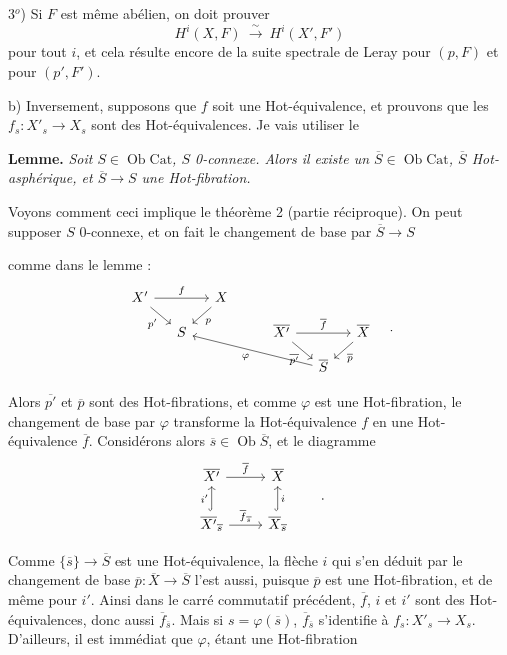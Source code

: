 \documentclass[11pt]{article}
\newcommand{\printedpage}[1]{\marginpar{\footnotesize p.~#1}}
\newcommand{\msp}[1]{\marginpar{\footnotesize [#1]}}
\newcommand{\Cat}{\mathrm{Cat}}
\newcommand{\Ob}{\operatorname{Ob}}
\begin{document}
3$^{o}$) Si $F$ est même abélien, on doit prouver
\[
H^i(X,F) \ \xrightarrow{\ \sim\ }\ H^i(X',F')
\]
pour tout $i$, et cela résulte encore de la suite spectrale de Leray pour $(p,F)$ et pour $(p',F')$.

b) Inversement, supposons que $f$ soit une Hot-équivalence, et prouvons que les $f_s : X'_s \longrightarrow X_s$ sont des Hot-équivalences. Je vais utiliser le

\textbf{Lemme.} \textit{Soit $S \in \Ob\Cat$, $S$ \textup{0}-connexe. Alors il existe un $\overline{S} \in \Ob\Cat$, $\overline{S}$ \textup{Hot}-asphérique, et $\overline{S} \longrightarrow S$ une \textup{Hot}-fibration.}

Voyons comment ceci implique le théorème 2 (partie réciproque). On peut supposer $S$ 0-connexe, et on fait le changement de base par $\overline{S} \longrightarrow S$

\msp{page 134}

comme dans le lemme :
\[
\begin{tikzcd}[column sep=small, row sep=small]
X' \arrow[rr, "f"] \arrow[dr, "p'"'] & & X \arrow[dl, "p"] & & & & \\
& S & & & \overline{X'} \arrow[rr, "\overline{f}"] \arrow[dr, "\overline{p'}"'] & & \overline{X} \arrow[dl, "\overline{p}"] \\
& & & & & \overline{S} \arrow[ullll, "\varphi"] &
\end{tikzcd}
\quad .
\]

Alors $\overline{p'}$ et $\overline{p}$ sont des Hot-fibrations, et comme $\varphi$ est une Hot-fibration, le changement de base par $\varphi$ transforme la Hot-équivalence $f$ en une Hot-équivalence $\overline{f}$. Considérons alors $\overline{s} \in \Ob\overline{S}$, et le diagramme
\[
\begin{tikzcd}
\overline{X'} \arrow[r, "\overline{f}"] & \overline{X} \\
\overline{X'}_{\overline{s}} \arrow[u, hook, "i'"] \arrow[r, "\overline{f}_{\overline{s}}"] & \overline{X}_{\overline{s}} \arrow[u, hook, "i"']
\end{tikzcd}
\qquad .
\]

\printedpage{6}

Comme $\{\overline{s}\} \longrightarrow \overline{S}$ est une Hot-équivalence, la flèche $i$ qui s'en déduit par le changement de base $\overline{p} : \overline{X} \longrightarrow \overline{S}$ l'est aussi, puisque $\overline{p}$ est une Hot-fibration, et de même pour $i'$. Ainsi dans le carré commutatif précédent, $\overline{f}$, $i$ et $i'$ sont des Hot-équivalences, donc aussi $\overline{f}_{\overline{s}}$. Mais si $s = \varphi(\overline{s})$, $\overline{f}_{\overline{s}}$ s'identifie à $f_s : X'_s \longrightarrow X_s$. D'ailleurs, il est immédiat que $\varphi$, étant une Hot-fibration
\end{document}
